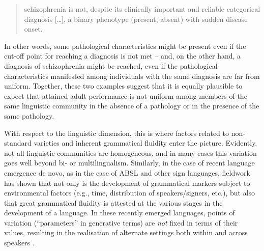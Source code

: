 \documentclass[output=paper]{langsci/langscibook}
\begin{document}
\begin{quote}

schizophrenia is not, despite its clinically important and reliable categorical
diagnosis [\dots], a binary phenotype (present, absent) with sudden disease
onset. \parencite[1]{EttingerEtAl2014}

\end{quote}

In other words, some pathological characteristics might be present even if the
cut-off point for reaching a diagnosis is not met -- and, on the other hand, a
diagnosis of schizophrenia might be reached, even if the pathological
characteristics manifested among individuals with the same diagnosis are far
from uniform.  Together, these two examples suggest that it is equally
plausible to expect that attained adult performance is not uniform among
members of the same linguistic community in the absence of a pathology or in
the presence of the same pathology.

With respect to the linguistic dimension, this is where factors related to
non-standard varieties and inherent grammatical fluidity enter the picture.
Evidently, not all linguistic communities are homogeneous, and in many cases
this variation goes well beyond bi- or multilingualism. Similarly, in the case
of recent language emergence de novo, as in the case of \gls{ABSL}  and other sign languages, fieldwork has shown that
not only is the development of grammatical markers subject to environmental
factors (e.g., time, distribution of speakers/signers, etc.), but also that
great grammatical fluidity is attested at the various stages in the development
of a language. In these recently emerged languages, points of variation
(\enquote{parameters} in generative terms) are \emph{not} fixed in terms of their
values, resulting in the realisation of alternate settings both within and
across speakers \parencite{Washabaugh1986,SandlerEtAl2011}.
\end{document}
